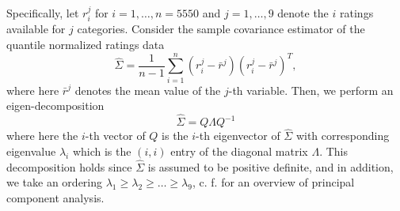 \documentclass[10pt]{article}
\begin{document}
Specifically, let $r_i^j$ for $i=1,\ldots,n=5550$ and $j=1,\ldots,9$ denote 
the $i$ ratings available for $j$ categories. Consider the sample covariance 
estimator of the quantile normalized ratings data
%
\begin{equation}
    \hat{\Sigma} = \frac{1}{n-1}\sum_{i=1}^n (r_i^j-\bar{r}^j)(r_i^j-\bar{r}^j)^T, 
\end{equation}
%
where here $\bar{r}^j$ denotes the mean value of the $j$-th variable.  Then, we 
perform an eigen-decomposition 
%
\begin{equation}
    \hat{\Sigma} = Q\Lambda Q^{-1}
\end{equation}
%
where here the $i$-th vector of $Q$ is the $i$-th eigenvector of $\hat{\Sigma}$ with 
corresponding eigenvalue $\lambda_i$ which is the $(i,i)$ entry of the diagonal matrix 
$\Lambda$.  This decomposition holds since $\hat{\Sigma}$ is assumed to be positive 
definite, and in addition, we take an ordering $\lambda_1\geq\lambda_2\geq \ldots\geq \lambda_9$,
c. f. \cite{Shlens05atutorial} for an overview of principal component analysis.
\end{document}
